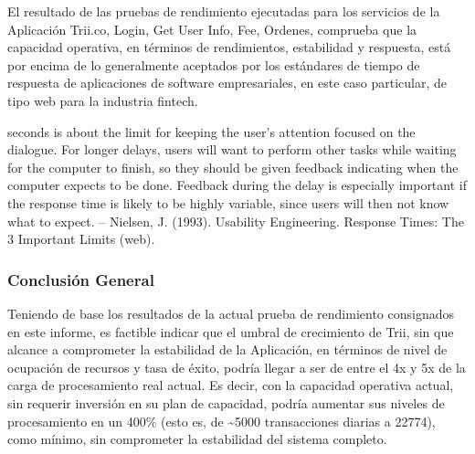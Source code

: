 \documentclass[
  paper=a4,
  ,captions=tableheading
]{scrartcl}
\renewenvironment{quote}{\begin{customblockquote}\list{}{\rightmargin=0em\leftmargin=0em}%
\item\relax\color{blockquote-text}\ignorespaces}{\unskip\unskip\endlist\end{customblockquote}}
\begin{document}
El resultado de las pruebas de rendimiento ejecutadas para los servicios
de la Aplicación Trii.co, Login, Get User Info, Fee, Ordenes, comprueba
que la capacidad operativa, en términos de rendimientos, estabilidad y
respuesta, está por encima de lo generalmente aceptados por los
estándares de tiempo de respuesta de aplicaciones de software
empresariales, en este caso particular, de tipo web para la industria
fintech.

\begin{quote}
10 seconds is about the limit for keeping the user's attention focused
on the dialogue. For longer delays, users will want to perform other
tasks while waiting for the computer to finish, so they should be given
feedback indicating when the computer expects to be done. Feedback
during the delay is especially important if the response time is likely
to be highly variable, since users will then not know what to expect. --
Nielsen, J. (1993). Usability Engineering. Response Times: The 3
Important Limits (web).
\end{quote}

\subsubsection{Conclusión General}\label{sec:conclusiuxf3n-general}

Teniendo de base los resultados de la actual prueba de rendimiento
consignados en este informe, es factible indicar que el umbral de
crecimiento de Trii, sin que alcance a comprometer la estabilidad de la
Aplicación, en términos de nivel de ocupación de recursos y tasa de
éxito, podría llegar a ser de entre el 4x y 5x de la carga de
procesamiento real actual. Es decir, con la capacidad operativa actual,
sin requerir inversión en su plan de capacidad, podría aumentar sus
niveles de procesamiento en un 400\% (esto es, de \textasciitilde5000
transacciones diarias a 22774), como mínimo, sin comprometer la
estabilidad del sistema completo.
\end{document}
